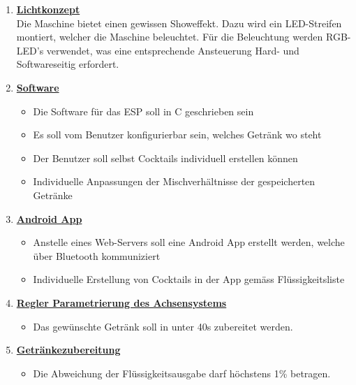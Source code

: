 \begin{enumerate}

\item \underline{\textbf{Lichtkonzept}}\mbox{}\\

Die Maschine bietet einen gewissen Showeffekt. Dazu wird ein LED-Streifen montiert, welcher die Maschine beleuchtet. Für die Beleuchtung werden RGB-LED's verwendet, was eine entsprechende Ansteuerung Hard- und Softwareseitig erfordert.\\

\item \underline{\textbf{Software}}\mbox{}\\
\begin{itemize}
\item Die Software für das ESP soll in C geschrieben sein
\item Es soll vom Benutzer konfigurierbar sein, welches Getränk wo steht
\item Der Benutzer soll selbst Cocktails individuell erstellen können
\item Individuelle Anpassungen der Mischverhältnisse der gespeicherten Getränke \\ 
\end{itemize}

\item \underline{\textbf{Android App}}\mbox{}\\
\begin{itemize}
\item Anstelle eines Web-Servers soll eine Android App erstellt werden, welche über Bluetooth kommuniziert
\item Individuelle Erstellung von Cocktails in der App gemäss Flüssigkeitsliste \\
\end{itemize}

\item \underline{\textbf{Regler Parametrierung des Achsensystems}}\mbox{}\\
\begin{itemize}
\item Das gewünschte Getränk soll in unter 40s zubereitet werden. \\
\end{itemize}

\item \underline{\textbf{Getränkezubereitung}}\mbox{}\\
\begin{itemize}
\item Die Abweichung der Flüssigkeitsausgabe darf höchstens 1\% betragen. \\
\end{itemize}

\end{enumerate}


